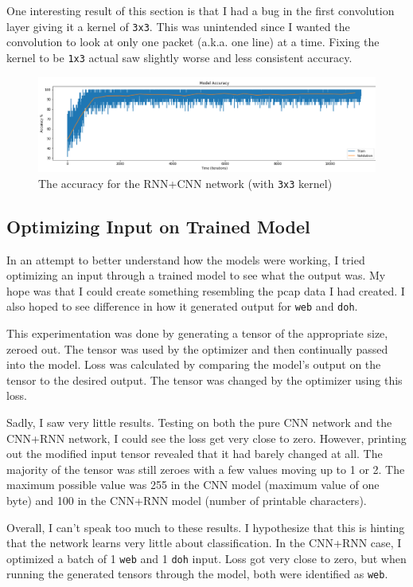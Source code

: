 \documentclass[fleqn,11pt]{article}
\begin{document}
One interesting result of this section is that I had a bug in the first convolution layer giving it a kernel of \texttt{3x3}.
This was unintended since I wanted the convolution to look at only one packet (a.k.a. one line) at a time.
Fixing the kernel to be \texttt{1x3} actual saw slightly worse and less consistent accuracy.

\begin{figure}[H]
    \centering
    \includegraphics[width=.95\linewidth]{cnn_rnn_acc.png}
    \caption{The accuracy for the RNN+CNN network (with \texttt{3x3} kernel)}
\end{figure}

\subsection{Optimizing Input on Trained Model}
In an attempt to better understand how the models were working, I tried optimizing an input through a trained model to see what the output was.
My hope was that I could create something resembling the pcap data I had created.
I also hoped to see difference in how it generated output for \texttt{web} and \texttt{doh}.

This experimentation was done by generating a tensor of the appropriate size, zeroed out.
The tensor was used by the optimizer and then continually passed into the model.
Loss was calculated by comparing the model's output on the tensor to the desired output.
The tensor was changed by the optimizer using this loss.

Sadly, I saw very little results.
Testing on both the pure CNN network and the CNN+RNN network, I could see the loss get very close to zero.
However, printing out the modified input tensor revealed that it had barely changed at all.
The majority of the tensor was still zeroes with a few values moving up to 1 or 2.
The maximum possible value was 255 in the CNN model (maximum value of one byte) and 100 in the CNN+RNN model (number of printable characters).

Overall, I can't speak too much to these results.
I hypothesize that this is hinting that the network learns very little about classification.
In the CNN+RNN case, I optimized a batch of 1 \texttt{web} and 1 \texttt{doh} input.
Loss got very close to zero, but when running the generated tensors through the model, both were identified as \texttt{web}.
\end{document}

